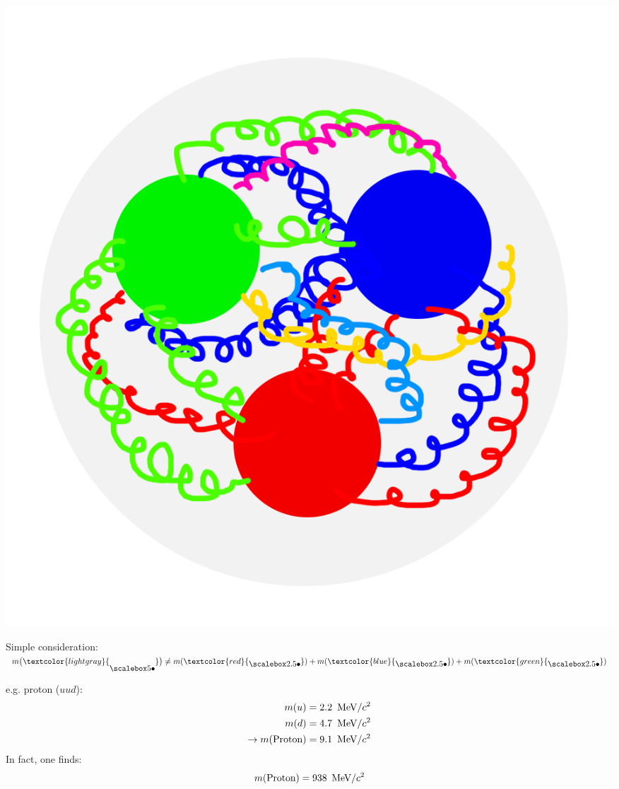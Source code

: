 \begin{frame}\addtocounter{framenumber}{-1}
\begin{minipage} {0.3\textwidth}
\includegraphics[width=\textwidth]{Figures Introductory Lecture/Standard Model/Hadron_seequarks_coloured.png}
\end{minipage}
\begin{minipage} {0.65\textwidth}
Simple consideration:\\  $m\big( \textcolor{lightgray}{ \BigbulletG}\big)\neq m(\textcolor{red}{\Bigbullet})+m(\textcolor{blue}{\Bigbullet})+m(\textcolor{green}{\Bigbullet})$
\end{minipage}
e.g. proton ($uud$):\\
\begin{align*} 
m(u)&=2.2  \,\textmd{ MeV}/c^2\\m(d)&= 4.7 \, \textmd{ MeV}/c^2 \\ \rightarrow m(\textmd{Proton})&=9.1  \,\textmd{ MeV}/c^2
\end{align*} 
In fact, one finds:
\begin{align*} 
m(\textmd{Proton})=938  \,\textmd{ MeV}/c^2
\end{align*} 
\end{frame}
